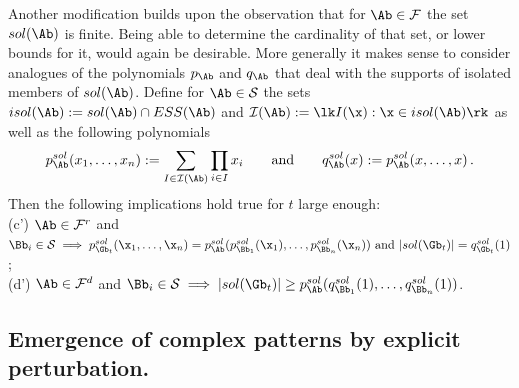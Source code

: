 \documentclass[moor]{informs3}              %
\def\cowe#1{{#1}} %
\begin{document}
\cowe{Another modification builds upon the observation that for $\Ab\in\mathcal F$ the set $sol(\Ab)$ is finite. Being able to determine the cardinality of that set, or lower bounds for it, would again be desirable. More generally it makes sense to consider analogues of the polynomials $p_\Ab$ and $q_\Ab$ that deal with the supports of isolated members of $sol(\Ab)$. Define for $\Ab\in\mathcal S$ the sets $isol(\Ab):=sol(\Ab)\cap ESS(\Ab)$ and
${\mathcal I}(\Ab) := \lk I(\x) : \x\in isol(\Ab)\rk$ as well as the following polynomials
$$p^{sol}_{\Ab}(x_1,\ldots,x_n):=\sum_{I\in {\mathcal I}(\Ab)}\prod_{i\in I}x_i \qquad \mbox{and}\qquad q^{sol}_{\Ab}(x):=p^{sol}_{\Ab}(x,\ldots,x)\, .$$
Then the following implications hold true for $t$ large enough:\\
\noindent
(c') $\Ab\in {\mathcal F}^r$ and $\Bb_i\in {\mathcal S}\;\Longrightarrow \; p^{sol}_{\Gb_t} (\x_1, \ldots , \x_n)  = p^{sol}_{\Ab} ( p^{sol}_{\Bb_1}(\x_1), \ldots,  p^{sol}_{\Bb_n}(\x_n))\textup{ and }|sol({\Gb_t})|=q^{sol}_{\Gb_t} (1)$;\\
\noindent
(d') $\Ab\in {\mathcal F}^d$ and $\Bb_i\in {\mathcal S}\;\Longrightarrow \; |sol({\Gb_t})|\ge p^{sol}_{\Ab} (q^{sol}_{\Bb_1}(1), \ldots,  q^{sol}_{\Bb_n}(1))$.
}
\subsection{Emergence of complex patterns by explicit perturbation.}\label{secpert}
\end{document}
